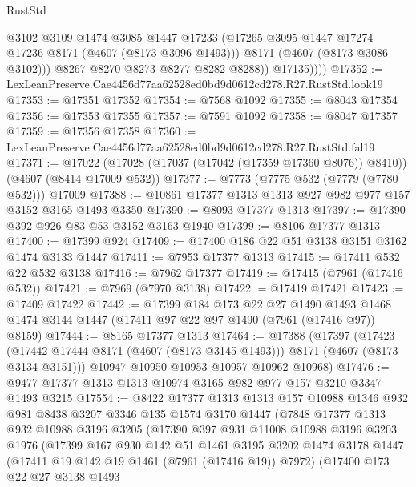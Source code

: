 \begin{lexlean}{RustStd}
\begin{coremodule}
                  @3102
                  @3109
                  @1474
                  @3085
                  @1447
                  @17233
                  (@17265 @3095 @1447 @17274 @17236 @8171 (@4607 (@8173 @3096 @1493)))
                  @8171
                  (@4607 (@8173 @3086 @3102)))
                @8267
                @8270
                @8273
                @8277
                @8282
                @8288))
            @17135))))
@17352 := LexLeanPreserve.Cae4456d77aa62528ed0bd9d0612cd278.R27.RustStd.look19
@17353 := @17351 @17352
@17354 := @7568 @1092
@17355 := @8043 @17354
@17356 := @17353 @17355
@17357 := @7591 @1092
@17358 := @8047 @17357
@17359 := @17356 @17358
@17360 := LexLeanPreserve.Cae4456d77aa62528ed0bd9d0612cd278.R27.RustStd.fal19
@17371 := @17022 (@17028 (@17037 (@17042 (@17359 @17360 @8076)) @8410)) (@4607 (@8414 @17009 @532))
@17377 := @7773 (@7775 @532 (@7779 (@7780 @532))) @17009
@17388 := @10861 @17377 @1313 @1313 @927 @982 @977 @157 @3152 @3165 @1493 @3350
@17390 := @8093 @17377 @1313
@17397 := @17390 @392 @926 @83 @53 @3152 @3163 @1940
@17399 := @8106 @17377 @1313
@17400 := @17399 @924
@17409 := @17400 @186 @22 @51 @3138 @3151 @3162 @1474 @3133 @1447
@17411 := @7953 @17377 @1313
@17415 := @17411 @532 @22 @532 @3138
@17416 := @7962 @17377
@17419 := @17415 (@7961 (@17416 @532))
@17421 := @7969 (@7970 @3138)
@17422 := @17419 @17421
@17423 := @17409 @17422
@17442 := @17399
    @184
    @173
    @22
    @27
    @1490
    @1493
    @1468
    @1474
    @3144
    @1447
    (@17411 @97 @22 @97 @1490 (@7961 (@17416 @97)) @8159)
@17444 := @8165 @17377 @1313
@17464 := @17388
    (@17397
      (@17423 (@17442 @17444 @8171 (@4607 (@8173 @3145 @1493))) @8171 (@4607 (@8173 @3134 @3151)))
      @10947
      @10950
      @10953
      @10957
      @10962
      @10968)
@17476 := @9477 @17377 @1313 @1313 @10974 @3165 @982 @977 @157 @3210 @3347 @1493 @3215
@17554 := @8422
    @17377
    @1313
    @1313
    @157
    @10988
    @1346
    @932
    @981
    @8438
    @3207
    @3346
    @135
    @1574
    @3170
    @1447
    (@7848
      @17377
      @1313
      @932
      @10988
      @3196
      @3205
      (@17390
        @397
        @931
        @11008
        @10988
        @3196
        @3203
        @1976
        (@17399
          @167
          @930
          @142
          @51
          @1461
          @3195
          @3202
          @1474
          @3178
          @1447
          (@17411 @19 @142 @19 @1461 (@7961 (@17416 @19)) @7972)
          (@17400
            @173
            @22
            @27
            @3138
            @1493

\end{coremodule}
\end{lexlean}
